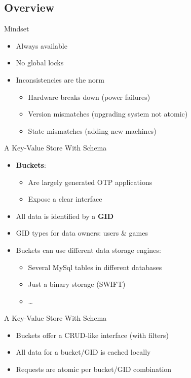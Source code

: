 \documentclass[aspectratio=169]{beamer}
\begin{document}
\subsection{Overview}

\begin{frame}{Mindset}
    \begin{itemize}
        \item Always available
        \item No global locks
        \item Inconsistencies are the norm
            \begin{itemize}
                \item Hardware breaks down (power failures)
                \item Version mismatches (upgrading system not atomic)
                \item State mismatches (adding new machines)
            \end{itemize}
    \end{itemize}
\end{frame}

\begin{frame}{A Key-Value Store With Schema}
    \begin{itemize}
        \item \textbf{Buckets}:
            \begin{itemize}
                \item Are largely generated OTP applications
                \item Expose a clear interface
            \end{itemize}
        \item All data is identified by a \textbf{GID}
        \item GID types for data owners: users \& games
        \item Buckets can use different data storage engines:
            \begin{itemize}
                \item Several MySql tables in different databases
                \item Just a binary storage (SWIFT)
                \item \dots
            \end{itemize}
    \end{itemize}
\end{frame}

\begin{frame}{A Key-Value Store With Schema}
    \begin{itemize}
        \item Buckets offer a CRUD-like interface (with filters)
        \item All data for a bucket/GID is cached locally
        \item Requests are atomic per bucket/GID combination
    \end{itemize}
\end{frame}
\end{document}
